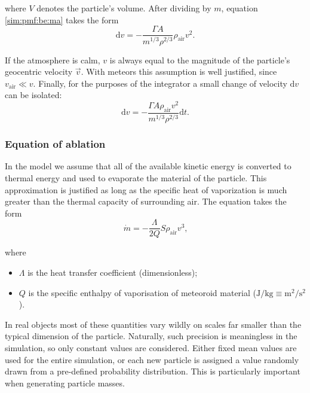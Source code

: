             where $V$ denotes the particle's volume. After dividing by $m$, equation \ref{sim:pmf:be:ma} takes the form
            \begin{equation}
                \mathrm{d}v = - \frac{\Gamma A}{m^{1/3}\rho^{2/3}}\rho_{\mathrm{air}} v^2\text{.}
                \label{sim:pmf:be:dotv}
            \end{equation}

            If the atmosphere is calm, $v$ is always equal to the magnitude of the particle's geocentric velocity $\vec{v}$.
            With meteors this assumption is well justified, since $v_{\mathrm{air}} \ll v$.
            Finally, for the purposes of the integrator a small change of velocity $\mathrm{d}v$ can be isolated:
            \begin{equation}
                \mathrm{d}v = -\frac{\Gamma A \rho_{\mathrm{air}} v^2}{m^{1/3} \rho^{2/3}} \mathrm{d}t\text{.}
                \label{sim:pmf:be:dv}
            \end{equation}

        \subsubsection{Equation of ablation} \label{sim:pmf:ea}
            In the model we assume that all of the available kinetic energy is converted to thermal energy and used
            to evaporate the material of the particle. This approximation is justified as long as the specific heat
            of vaporization is much greater than the thermal capacity of surrounding air. The equation takes the form
            \begin{equation}
                \dot{m} = -\frac{\Lambda}{2Q} S \rho_{\mathrm{air}} v^3\text{,}
                \label{sim:pmf:ea:dotm}
            \end{equation}

            where
            \begin{itemize}
                \item $\Lambda$ is the heat transfer coefficient (dimensionless);
                \item $Q$ is the specific enthalpy of vaporisation of meteoroid material
                    ($\si{\joule\per\kilo\gram} \equiv \si{\metre\squared\per\second\squared}$).
            \end{itemize}

            In real objects most of these quantities vary wildly on scales far smaller than the typical dimension of the particle.
            Naturally, such precision is meaningless in the simulation, so only constant values are considered. Either fixed mean values
            are used for the entire simulation, or each new particle is assigned a value randomly drawn from
            a pre-defined probability distribution. This is particularly important when generating particle masses.


